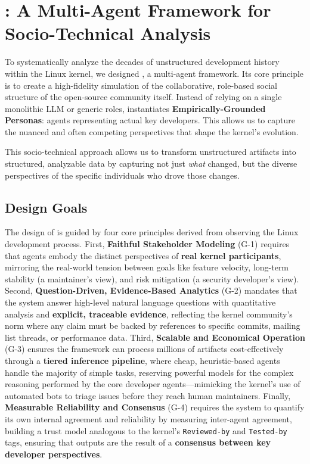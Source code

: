
\section{\sys: A Multi-Agent Framework for Socio-Technical Analysis}

To systematically analyze the decades of unstructured development history within the Linux kernel, we designed \sys, a multi-agent framework. Its core principle is to create a high-fidelity simulation of the collaborative, role-based social structure of the open-source community itself. Instead of relying on a single monolithic LLM or generic roles, \sys instantiates \textbf{Empirically-Grounded Personas}: agents representing actual key developers. This allows us to capture the nuanced and often competing perspectives that shape the kernel's evolution.

This socio-technical approach allows us to transform unstructured artifacts into structured, analyzable data by capturing not just \emph{what} changed, but the diverse perspectives of the specific individuals who drove those changes.

\subsection{Design Goals}

The design of \sys is guided by four core principles derived from observing the Linux development process. First, \textbf{Faithful Stakeholder Modeling} (G-1) requires that agents embody the distinct perspectives of \textbf{real kernel participants}, mirroring the real-world tension between goals like feature velocity, long-term stability (a maintainer's view), and risk mitigation (a security developer's view). Second, \textbf{Question-Driven, Evidence-Based Analytics} (G-2) mandates that the system answer high-level natural language questions with quantitative analysis and \textbf{explicit, traceable evidence}, reflecting the kernel community's norm where any claim must be backed by references to specific commits, mailing list threads, or performance data. Third, \textbf{Scalable and Economical Operation} (G-3) ensures the framework can process millions of artifacts cost-effectively through a \textbf{tiered inference pipeline}, where cheap, heuristic-based agents handle the majority of simple tasks, reserving powerful models for the complex reasoning performed by the core developer agents—mimicking the kernel's use of automated bots to triage issues before they reach human maintainers. Finally, \textbf{Measurable Reliability and Consensus} (G-4) requires the system to quantify its own internal agreement and reliability by measuring inter-agent agreement, building a trust model analogous to the kernel's \texttt{Reviewed-by} and \texttt{Tested-by} tags, ensuring that outputs are the result of a \textbf{consensus between key developer perspectives}.


